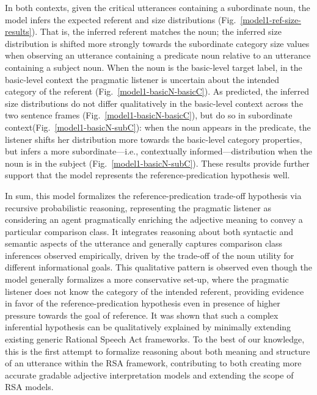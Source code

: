 In both contexts, given the critical utterances containing a subordinate noun, the model infers the expected referent and size distributions (Fig.~\ref{model1-ref-size-results}). That is, the inferred referent matches the noun; the inferred size distribution is shifted more strongly towards the subordinate category size values when observing an utterance containing a predicate noun relative to an utterance containing a subject noun. 
When the noun is the basic-level target label, in the basic-level context the pragmatic listener is uncertain about the intended category of the referent (Fig.~\ref{model1-basicN-basicC}). As predicted, the inferred size distributions do not differ qualitatively in the basic-level context across the two sentence frames (Fig.~\ref{model1-basicN-basicC}), but do so in subordinate context(Fig.~\ref{model1-basicN-subC}): when the noun appears in the predicate, the listener shifts her distribution more towards the basic-level category properties, but infers a more subordinate---i.e., contextually informed---distribution when the noun is in the subject (Fig.~\ref{model1-basicN-subC}). These results provide further support that the model represents the reference-predication hypothesis well.

In sum, this model formalizes the reference-predication trade-off hypothesis via recursive probabilistic reasoning, representing the pragmatic listener as considering an agent pragmatically enriching the adjective meaning to convey a particular comparison class. It integrates reasoning about both syntactic and semantic aspects of the utterance and generally captures comparison class inferences observed empirically, driven by the trade-off of the noun utility for different informational goals. This qualitative pattern is observed even though the model generally formalizes a more conservative set-up, where the pragmatic listener does not know the category of the intended referent, providing evidence in favor of the reference-predication hypothesis even in presence of higher pressure towards the goal of reference. It was shown that such a complex inferential hypothesis can be qualitatively explained by minimally extending existing generic Rational Speech Act frameworks. To the best of our knowledge, this is the first attempt to formalize reasoning about both meaning and structure of an utterance within the RSA framework,  contributing to both creating more accurate gradable adjective interpretation models and extending the scope of RSA models. 
